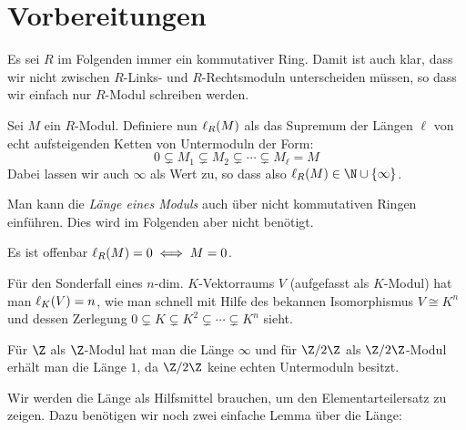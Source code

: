 

\newcommand{\ZRest}[1]{\Z/#1\Z}

\chapter{Vorbereitungen}
Es sei $R$ im Folgenden immer ein kommutativer Ring. Damit ist auch klar, dass
wir nicht zwischen $R$-Links- und $R$-Rechtsmoduln unterscheiden müssen, so dass
wir einfach nur $R$-Modul schreiben werden.

\begin{thDef}
    Sei $M$ ein $R$-Modul. Definiere nun $\len(M)$ als das Supremum der Längen
    $\ell$ von echt aufsteigenden Ketten von Untermoduln der Form:
    \[ 0 \subsetneq M_1 \subsetneq M_2 \subsetneq \cdots \subsetneq M_\ell = M \]
    Dabei lassen wir auch $\infty$ als Wert zu, so dass also $\len(M) \in
    \N\cup\{\infty\}$.
\end{thDef}

\begin{thBemerkung}
    Man kann die \emph{Länge eines Moduls} auch über nicht kommutativen Ringen
    einführen. Dies wird im Folgenden aber nicht benötigt.
\end{thBemerkung}

\begin{thBeispiele}
\item
    Es ist offenbar $\len(M) = 0 \iff M = 0$.
\item
    Für den Sonderfall eines $n$-dim. $K$-Vektorraums $V$ (aufgefasst als
    $K$-Modul) hat man $\len[K](V) = n$, wie man schnell mit Hilfe des bekannen
    Isomorphismus $V \cong K^n$ und dessen Zerlegung $0\subsetneq K \subsetneq
    K^2 \subsetneq \cdots \subsetneq K^n$ sieht.
\item
    Für $\Z$ als $\Z$-Modul hat man die Länge $\infty$ und für $\ZRest2$ als
    $\ZRest2$-Modul erhält man die Länge $1$, da $\ZRest2$ keine echten
    Untermoduln besitzt.
\end{thBeispiele}

Wir werden die Länge als Hilfsmittel brauchen, um den Elementarteilersatz
zu zeigen. Dazu benötigen wir noch zwei einfache Lemma über die Länge:

